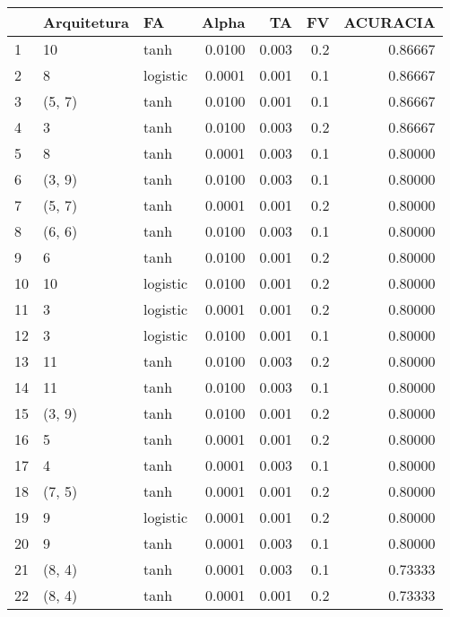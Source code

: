 \begin{tabular}{lllrrrr}
\toprule
{} & Arquitetura &        FA &   Alpha &     TA &   FV &  ACURACIA \\
\midrule
1   &          10 &      tanh &  0.0100 &  0.003 &  0.2 &   0.86667 \\
2   &           8 &  logistic &  0.0001 &  0.001 &  0.1 &   0.86667 \\
3   &      (5, 7) &      tanh &  0.0100 &  0.001 &  0.1 &   0.86667 \\
4   &           3 &      tanh &  0.0100 &  0.003 &  0.2 &   0.86667 \\
5   &           8 &      tanh &  0.0001 &  0.003 &  0.1 &   0.80000 \\
6   &      (3, 9) &      tanh &  0.0100 &  0.003 &  0.1 &   0.80000 \\
7   &      (5, 7) &      tanh &  0.0001 &  0.001 &  0.2 &   0.80000 \\
8   &      (6, 6) &      tanh &  0.0100 &  0.003 &  0.1 &   0.80000 \\
9   &           6 &      tanh &  0.0100 &  0.001 &  0.2 &   0.80000 \\
10  &          10 &  logistic &  0.0100 &  0.001 &  0.2 &   0.80000 \\
11  &           3 &  logistic &  0.0001 &  0.001 &  0.2 &   0.80000 \\
12  &           3 &  logistic &  0.0100 &  0.001 &  0.1 &   0.80000 \\
13  &          11 &      tanh &  0.0100 &  0.003 &  0.2 &   0.80000 \\
14  &          11 &      tanh &  0.0100 &  0.003 &  0.1 &   0.80000 \\
15  &      (3, 9) &      tanh &  0.0100 &  0.001 &  0.2 &   0.80000 \\
16  &           5 &      tanh &  0.0001 &  0.001 &  0.2 &   0.80000 \\
17  &           4 &      tanh &  0.0001 &  0.003 &  0.1 &   0.80000 \\
18  &      (7, 5) &      tanh &  0.0001 &  0.001 &  0.2 &   0.80000 \\
19  &           9 &  logistic &  0.0001 &  0.001 &  0.2 &   0.80000 \\
20  &           9 &      tanh &  0.0001 &  0.003 &  0.1 &   0.80000 \\
21  &      (8, 4) &      tanh &  0.0001 &  0.003 &  0.1 &   0.73333 \\
22  &      (8, 4) &      tanh &  0.0001 &  0.001 &  0.2 &   0.73333 \\

\end{tabular}
